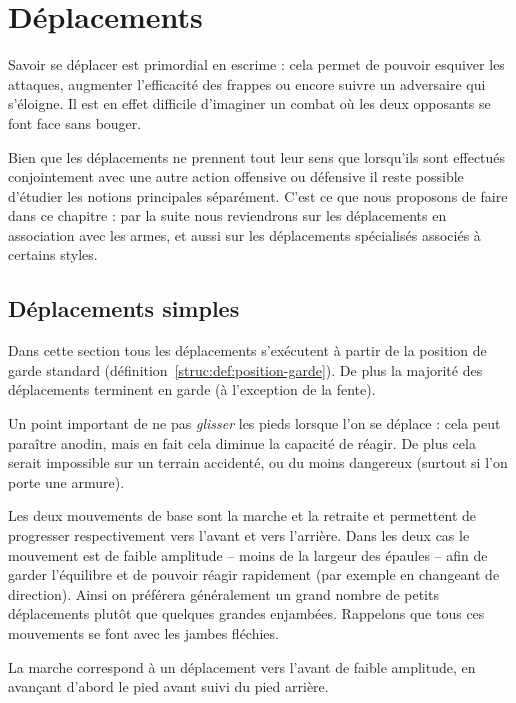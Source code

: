 \chapter{Déplacements}


Savoir se déplacer est primordial en escrime : cela permet de pouvoir esquiver les attaques, augmenter l'efficacité des frappes ou encore suivre un adversaire qui s'éloigne.
Il est en effet difficile d'imaginer un combat où les deux opposants se font face sans bouger.

Bien que les déplacements ne prennent tout leur sens que lorsqu'ils sont effectués conjointement avec une autre action offensive ou défensive il reste possible d'étudier les notions principales séparément.
C'est ce que nous proposons de faire dans ce chapitre : par la suite nous reviendrons sur les déplacements en association avec les armes, et aussi sur les déplacements spécialisés associés à certains styles.


\section{Déplacements simples}



Dans cette section tous les déplacements s'exécutent à partir de la position de garde standard (définition~\ref{struc:def:position-garde}).
De plus la majorité des déplacements terminent en garde (à l'exception de la fente).

Un point important de ne pas \emph{glisser} les pieds lorsque l'on se déplace : cela peut paraître anodin, mais en fait cela diminue la capacité de réagir.
De plus cela serait impossible sur un terrain accidenté, ou du moins dangereux (surtout si l'on porte une armure).

Les deux mouvements de base sont la marche et la retraite et permettent de progresser respectivement vers l'avant et vers l'arrière.
Dans les deux cas le mouvement est de faible amplitude -- moins de la largeur des épaules -- afin de garder l'équilibre et de pouvoir réagir rapidement (par exemple en changeant de direction).
Ainsi on préférera généralement un grand nombre de petits déplacements plutôt que quelques grandes enjambées.
Rappelons que tous ces mouvements se font avec les jambes fléchies.


\begin{definition}[Marche]

La marche correspond à un déplacement vers l'avant de faible amplitude, en avançant d'abord le pied avant suivi du pied arrière.
\end{definition}


